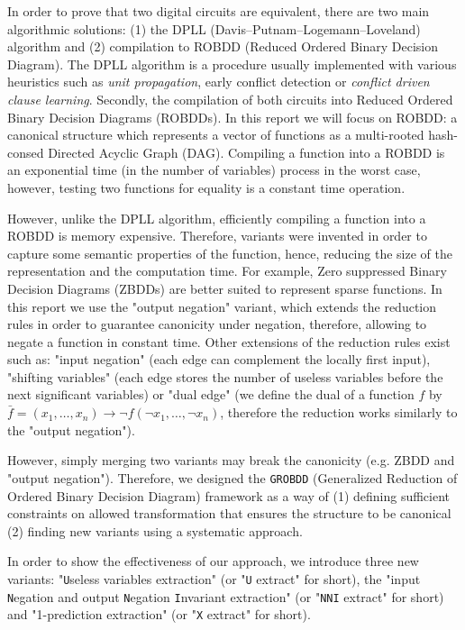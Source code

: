 \documentclass[a4paper,10pt]{article}
\newcommand{\Uextract}{"\texttt{U}seless variables extraction"}
\newcommand{\uextract}{"\texttt{U} extract"}
\newcommand{\NNIextract}{"input \texttt{N}egation and output \texttt{N}egation \texttt{I}nvariant extraction"}
\newcommand{\nniextract}{"\texttt{NNI} extract"}
\newcommand{\Xextract}{"1-prediction extraction"}
\newcommand{\xextract}{"\texttt{X} extract"}
\newcommand{\GroBdd}{\texttt{GROBDD}}
\begin{document}
In order to prove that two digital circuits are equivalent, there are two main algorithmic solutions: (1) the DPLL (Davis–Putnam–Logemann–Loveland) algorithm and (2) compilation to ROBDD (Reduced Ordered Binary Decision Diagram).
The DPLL algorithm is a procedure usually implemented with various heuristics such as \textit{unit propagation}, early conflict detection or \textit{conflict driven clause learning}.
Secondly, the compilation of both circuits into Reduced Ordered Binary Decision Diagrams (ROBDDs).
In this report we will focus on ROBDD: a canonical structure which represents a vector of functions as a multi-rooted hash-consed Directed Acyclic Graph (DAG).
Compiling a function into a ROBDD is an exponential time (in the number of variables) process in the worst case, however, testing two functions for equality is a constant time operation.


However, unlike the DPLL algorithm, efficiently compiling a function into a ROBDD is memory expensive.
Therefore, variants were invented in order to capture some semantic properties of the function, hence, reducing the size of the representation and the computation time.
For example, Zero suppressed Binary Decision Diagrams (ZBDDs) are better suited to represent sparse functions.
In this report we use the "output negation" variant\cite{BryantVariantN}, which extends the reduction rules in order to guarantee canonicity under negation, therefore, allowing to negate a function in constant time.
Other extensions of the reduction rules exist such as: "input negation"\cite{MinatoVariants} (each edge can complement the locally first input), "shifting variables"\cite{MinatoVariants} (each edge stores the number of useless variables before the next significant variables) or "dual edge"\cite{RolfVariantDual} (we define the dual of a function $f$ by $\bar{f} = (x_1, \dots, x_n) \longrightarrow \lnot f(\lnot x_1, \dots, \lnot x_n)$, therefore the reduction works similarly to the "output negation").

However, simply merging two variants may break the canonicity (e.g. ZBDD and "output negation").
Therefore, we designed the \GroBdd{} (Generalized Reduction of Ordered Binary Decision Diagram) framework as a way of (1) defining sufficient constraints on allowed transformation that ensures the structure to be canonical (2) finding new variants using a systematic approach.

In order to show the effectiveness of our approach, we introduce three new variants: \Uextract{} (or \uextract{} for short), the \NNIextract{} (or \nniextract{} for short) and \Xextract{} (or \xextract{} for short).
\end{document}
